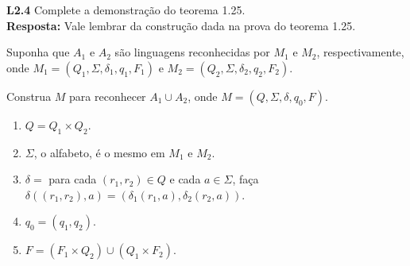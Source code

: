 
\noindent \textbf{L2.4} Complete a demonstração do teorema 1.25.\\[3pt]
\textbf{Resposta:} Vale lembrar da construção dada na prova do teorema 1.25.

Suponha que $A_1$ e $A_2$ são linguagens reconhecidas por $M_1$ e $M_2$, respectivamente, onde $M_1 = (Q_1, \Sigma, \delta_1, q_1, F_1)$ e $M_2 = (Q_2, \Sigma, \delta_2, q_2, F_2)$.

Construa $M$ para reconhecer $A_1 \cup A_2$, onde $M = (Q, \Sigma, \delta, q_0, F)$.
\begin{enumerate}[label=\textbf{\arabic*}]
    \item $Q = Q_1 \times Q_2$.
    \item $\Sigma$, o alfabeto, é o mesmo em $M_1$ e $M_2$.
    \item $\delta = $ para cada $(r_1, r_2) \in Q$ e cada $a \in \Sigma$, faça $\delta((r_1, r_2), a) = (\delta_1(r_1, a), \delta_2(r_2, a))$.
    \item $q_0 = (q_1, q_2)$.
    \item $F = (F_1 \times Q_2) \cup (Q_1 \times F_2)$.
\end{enumerate}


